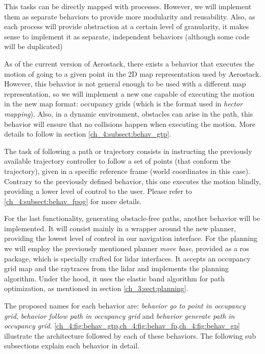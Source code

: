   This tasks can be directly mapped with processes. However, we will implement them as separate behaviors to provide more modularity and reusability. Also, as each process will provide abstraction at a certain level of granularity, it makes sense to implement it as separate, independent behaviors (although some code will be duplicated)

  As of the current version of Aerostack, there exists a behavior that executes the motion of going to a given point in the 2D map representation used by Aerostack. However, this behavior is not general enough to be used with a different map representation, so we will implement a new one capable of executing the motion in the new map format: occupancy grids (which is the format used in \textit{hector mapping}). Also, in a dynamic environment, obstacles can arise in the path, this behavior will ensure that no collisions happen when executing the motion. More details to follow in section \ref{ch_4:subsect:behav_gtp}.

  The task of following a path or trajectory consists in instructing the previously available trajectory controller to follow a set of points (that conform the trajectory), given in a specific reference frame (world coordinates in this case). Contrary to the previously defined behavior, this one executes the motion blindly, providing a lower level of control to the user. Please refer to \ref{ch_4:subsect:behav_fpog} for more details.

  For the last functionality, generating obstacle-free paths, another behavior will be implemented. It will consist mainly in a wrapper around the new planner, providing the lowest level of control in our navigation interface. For the planning we will employ the previously mentioned planner \textit{move base}, provided as a ros package, which is specially crafted for lidar interfaces. It accepts an occupancy grid map and the raytraces from the lidar and implements the planning algorithm. Under the hood, it uses the elastic band algorithm for path optimization, as mentioned in section \ref{ch_3:sect:planning}.

  The proposed names for each behavior are: \textit{behavior go to point in occupancy grid}, \textit{behavior follow path in occupancy grid} and \textit{behavior generate path in occupancy grid}. \cref{ch_4:fig:behav_gtp,ch_4:fig:behav_fp,ch_4:fig:behav_gp} illustrate the architecture followed by each of these behaviors. The following sub subsections explain each behavior in detail.

